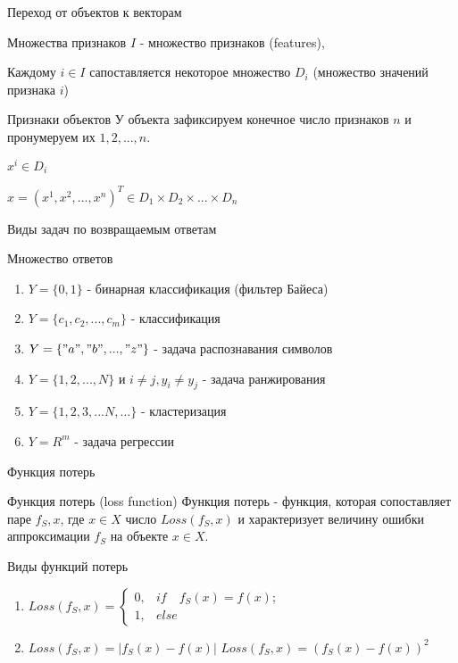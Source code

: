 \documentclass{beamer}
\begin{document}
\begin{frame}{Переход от объектов к векторам}
	\begin{block}{Множества признаков}
		$I$ - множество признаков (features),

		Каждому $i \in I$ сапоставляется некоторое множество $D_i$ (множество значений признака $i$) 
	\end{block}

	\begin{block}{Признаки объектов}
		У объекта зафиксируем конечное число признаков $n$ и пронумеруем их $1, 2, ..., n$.
		
		$x^i \in D_i$

		$x = (x^1, x^2, ..., x^n)^T \in D_1 \times D_2 \times ... \times D_n$
		
	\end{block}
\end{frame}
\begin{frame}{Виды задач по возвращаемым ответам}
	\begin{block}{Множество ответов}
		\begin{enumerate}
			\item $Y = \{0, 1\}$ - бинарная классификация (фильтер Байеса)
			\item $Y = \{c_1, c_2, ..., c_m\}$ - классификация 
			\item $Y = \{"a", "b", ..., "z"\}$ - задача распознавания символов
			\item $Y = \{1, 2, ..., N\}$ и $i \neq j, y_i \neq y_j$ - задача ранжирования
			\item $Y = \{1, 2, 3, ...N, ...\}$ - кластеризация
			\item $Y = R^m$ - задача регрессии 
		\end{enumerate}
	\end{block}
\end{frame}
\begin{frame}{Функция потерь}
	\begin{block}{Функция потерь (loss function)}
		Функция потерь - функция, которая сопоставляет паре $f_S, x$, где $x \in X$ число $Loss(f_S, x)$ и характеризует величину ошибки аппроксимации $f_S$ на объекте $x \in X$.
	\end{block}
	\begin{block}{Виды функций потерь}
                \begin{enumerate}
	                \item $Loss(f_S, x) = \begin{cases} 0,& if \quad f_S(x) = f(x); \\ 1,& else \end{cases}$
                       	\item $Loss(f_S, x) = |f_S(x) - f(x)|$ $Loss(f_S, x) = (f_S(x) - f(x))^2$
                \end{enumerate}
	\end{block}
\end{frame}
\end{document}
